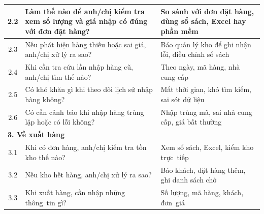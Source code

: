 \documentclass[a4paper,12pt]{report}
\begin{document}
\begin{longtable}{|c|p{8cm}|p{7cm}|}
    \hline
    2.2          & Làm thế nào để anh/chị kiểm tra xem số lượng và giá nhập có đúng với đơn đặt hàng?                                      & So sánh với đơn đặt hàng, dùng sổ sách, Excel hay phần mềm                                                              \\
    \hline
    2.3          & Nếu phát hiện hàng thiếu hoặc sai giá, anh/chị xử lý ra sao?                                                            & Báo quản lý kho để ghi nhận lỗi, điều chỉnh sổ sách                                                                     \\
    \hline
    2.4          & Khi cần tra cứu lần nhập hàng cũ, anh/chị tìm thế nào?                                                                  & Theo ngày, mã hàng, nhà cung cấp                                                                                        \\
    \hline
    2.5          & Có khó khăn gì khi theo dõi lịch sử nhập hàng không?                                                                    & Mất thời gian, khó tìm kiếm, sai sót dữ liệu                                                                            \\
    \hline
    2.6          & Có cần cảnh báo khi nhập hàng trùng lặp hoặc có lỗi không?                                                              & Nhập trùng mã, sai nhà cung cấp, giá bất thường                                                                         \\
    \hline
    \multicolumn{3}{|l|}{\textbf{3. Về xuất hàng}}                                                                                                                                                                                                                    \\
    \hline
    3.1          & Khi có đơn hàng, anh/chị kiểm tra tồn kho thế nào?                                                                      & Xem sổ sách, Excel, kiểm kho trực~tiếp                                                                                  \\
    \hline
    3.2          & Nếu kho hết hàng, anh/chị xử lý ra sao?                                                                                 & Báo khách, đặt hàng thêm, ghi danh sách chờ                                                                             \\
    \hline
    3.3          & Khi xuất hàng, cần nhập những thông~tin gì?                                                                             & Số lượng, mã hàng, khách, đơn~giá                                                                                       \\

\end{longtable}
\end{document}
